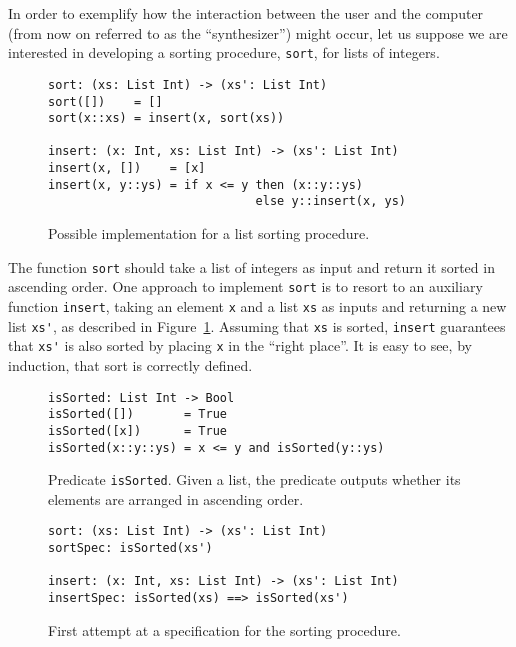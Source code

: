 In order to exemplify how the interaction between the user and the computer
(from now on referred to as the ``synthesizer'') might occur, let us suppose we
are interested in developing a sorting procedure, \verb|sort|, for lists of
integers.

\begin{figure}[h]
  \centering
\begin{verbatim}
sort: (xs: List Int) -> (xs': List Int)
sort([])    = []
sort(x::xs) = insert(x, sort(xs))

insert: (x: Int, xs: List Int) -> (xs': List Int)
insert(x, [])    = [x]
insert(x, y::ys) = if x <= y then (x::y::ys)
                             else y::insert(x, ys)
\end{verbatim}
  \caption{Possible implementation for a list sorting procedure.}
  \label{fig:sort-impl}
\end{figure}

The function \verb|sort| should take a list of integers as input and return it
sorted in ascending order. One approach to implement \verb|sort| is to resort to
an auxiliary function \verb|insert|, taking an element \verb|x| and a list
\verb|xs| as inputs and returning a new list \verb|xs'|, as described in
Figure~\ref{fig:sort-impl}. Assuming that \verb|xs| is sorted, \verb|insert|
guarantees that \verb|xs'| is also sorted by placing \verb|x| in the ``right
place''. It is easy to see, by induction, that sort is correctly defined.

\begin{figure}[h]
  \centering
\begin{verbatim}
isSorted: List Int -> Bool
isSorted([])       = True
isSorted([x])      = True
isSorted(x::y::ys) = x <= y and isSorted(y::ys)
\end{verbatim}
  \cprotect\caption{Predicate \verb|isSorted|. Given a list, the predicate
    outputs whether its elements are arranged in ascending order.}
  \label{fig:is-sorted-pred}
\end{figure}

\begin{figure}[h]
  \centering
\begin{verbatim}
sort: (xs: List Int) -> (xs': List Int)
sortSpec: isSorted(xs')

insert: (x: Int, xs: List Int) -> (xs': List Int)
insertSpec: isSorted(xs) ==> isSorted(xs')
\end{verbatim}
  \caption{First attempt at a specification for the sorting procedure.}
  \label{fig:sort-spec-1}
\end{figure}

